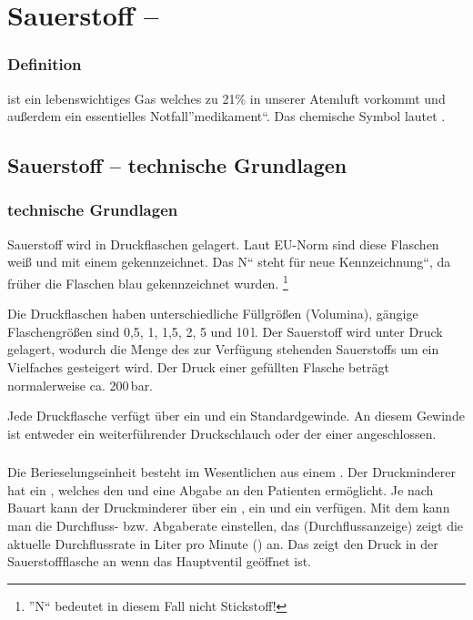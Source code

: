 \documentclass{beamer}
\begin{document}
\section{Sauerstoff -- }
\begin{frame}
\frametitle{Definition}
 ist ein
lebenswichtiges Gas welches zu 21\% in unserer Atemluft
vorkommt und außerdem ein essentielles
Notfall{\textquotedblright}medikament{\textquotedblleft}.
Das chemische Symbol lautet .
\end{frame}



\subsection{Sauerstoff -- technische Grundlagen}
\begin{frame}
\frametitle{technische Grundlagen}
Sauerstoff wird in Druckflaschen  gelagert. Laut EU-Norm sind diese
Flaschen weiß und mit einem
{\quotedblbase} gekennzeichnet.
Das {\quotedblbase}N{\textquotedblleft} steht für {\quotedblbase}neue Kennzeichnung{\textquotedblleft}, da früher die
Flaschen blau gekennzeichnet wurden. \footnote{{\textquotedblright}N{\textquotedblleft} bedeutet in diesem Fall nicht Stickstoff!}

Die Druckflaschen haben unterschiedliche Füllgrößen (Volumina),
gängige Flaschengrößen sind 0,5, 1, 1,5, 2, 5 und
10\,l. Der Sauerstoff wird unter Druck gelagert, wodurch die
Menge des zur Verfügung stehenden Sauerstoffs um ein Vielfaches
gesteigert wird. Der Druck einer gefüllten Flasche beträgt
normalerweise ca. 200\,bar. 

Jede Druckflasche verfügt über ein  und
ein Standardgewinde. An diesem Gewinde ist entweder ein
weiterführender Druckschlauch oder der 
einer  angeschlossen. 
\end{frame}

\begin{frame}
\frametitle{}
Die
Berieselungseinheit besteht im Wesentlichen aus einem
. Der Druckminderer hat ein
, welches den  und eine Abgabe an den Patienten ermöglicht. Je nach Bauart kann der Druckminderer über ein , ein 
und ein  verfügen. Mit dem
 kann man die Durchfluss- bzw. Abgaberate ein\-stellen, das
 (Durchflussanzeige) zeigt die aktuelle
Durchflussrate in Liter pro Minute (\gLMin) an. Das
 zeigt den Druck in der Sauerstoffflasche an
wenn das Haupt\-ventil geöffnet ist.
\end{frame}
\end{document}

